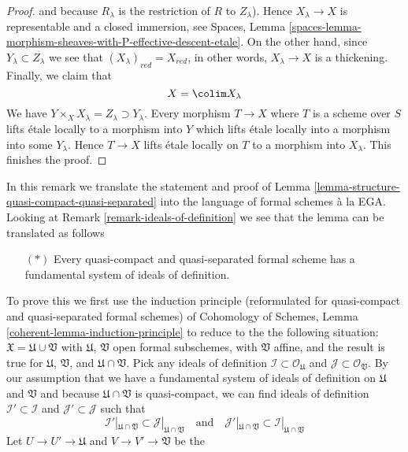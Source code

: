 \begin{proof}
and because $R_\lambda$ is the restriction of $R$ to $Z_\lambda$).
Hence $X_\lambda \to X$ is representable and a closed immersion, see
Spaces, Lemma
\ref{spaces-lemma-morphism-sheaves-with-P-effective-descent-etale}.
On the other hand, since $Y_\lambda \subset Z_\lambda$ we see that
$(X_\lambda)_{red} = X_{red}$, in other words, $X_\lambda \to X$
is a thickening. Finally, we claim that
$$
X = \colim X_\lambda
$$
We have $Y \times_X X_\lambda = Z_\lambda \supset Y_\lambda$. Every
morphism $T \to X$ where $T$ is a scheme over $S$ lifts \'etale locally
to a morphism into $Y$ which lifts \'etale locally into a morphism
into some $Y_\lambda$. Hence $T \to X$ lifts \'etale locally on
$T$ to a morphism into $X_\lambda$. This finishes the proof.
\end{proof}

\begin{remark}
\label{remark-structure-quasi-compact-quasi-separated}
In this remark we translate the statement and proof of
Lemma \ref{lemma-structure-quasi-compact-quasi-separated}
into the language of formal schemes \`a la EGA.
Looking at Remark \ref{remark-ideals-of-definition} we see
that the lemma can be translated as follows
\begin{itemize}
\item[$(*)$] Every quasi-compact and quasi-separated formal
scheme has a fundamental system of ideals of definition.
\end{itemize}
To prove this we first use the induction principle (reformulated for
quasi-compact and quasi-separated formal schemes) of
Cohomology of Schemes, Lemma \ref{coherent-lemma-induction-principle}
to reduce to the the following situation:
$\mathfrak X = \mathfrak U \cup \mathfrak V$
with $\mathfrak U$, $\mathfrak V$ open formal subschemes,
with $\mathfrak V$ affine, and the result is true for $\mathfrak U$,
$\mathfrak V$, and $\mathfrak U \cap \mathfrak V$. Pick any ideals
of definition $\mathcal{I} \subset \mathcal{O}_\mathfrak U$
and $\mathcal{J} \subset \mathcal{O}_\mathfrak V$.
By our assumption that we have a fundamental system of ideals
of definition on $\mathfrak U$ and $\mathfrak V$ and because
$\mathfrak U \cap \mathfrak V$ is quasi-compact, we can find
ideals of definition $\mathcal{I}' \subset \mathcal{I}$
and $\mathcal{J}' \subset \mathcal{J}$
such that
$$
\mathcal{I}'|_{\mathfrak U \cap \mathfrak V} \subset
\mathcal{J}|_{\mathfrak U \cap \mathfrak V}
\quad\text{and}\quad
\mathcal{J}'|_{\mathfrak U \cap \mathfrak V} \subset
\mathcal{I}|_{\mathfrak U \cap \mathfrak V}
$$
Let $U \to U' \to \mathfrak U$ and $V \to V' \to \mathfrak V$ be the

\end{remark}
